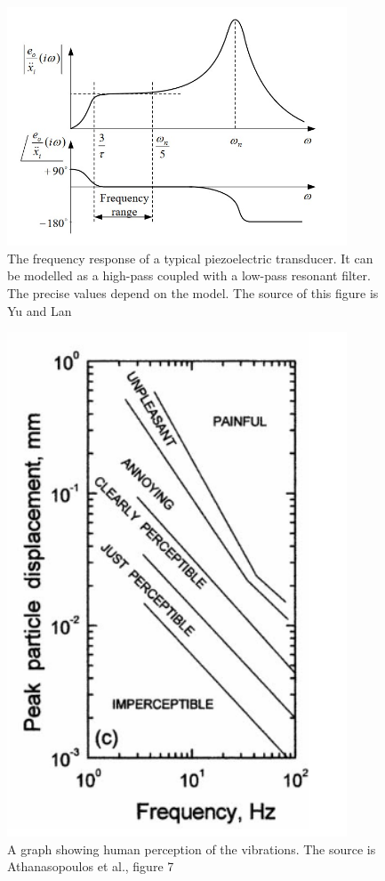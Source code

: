 \documentclass[a4paper,11pt]{article} %
\begin{document}
\begin{figure}[H]\label{Fig5}
  \centering
  \includegraphics[width=0.9\textwidth]{freq.jpg}
  \caption{The frequency response of a typical piezoelectric transducer. It can be modelled as a high-pass coupled with a low-pass resonant filter. The precise values depend on the model. The source of this figure is Yu and Lan \cite{freq}} 
\end{figure}

\begin{figure}[H]\label{Fig6}
  \centering
  \includegraphics[width=0.9\textwidth]{vibes.PNG}
  \caption{A graph showing human perception of the vibrations. The source is Athanasopoulos et al., figure 7\cite{vibes}} 
\end{figure}
\end{document}
